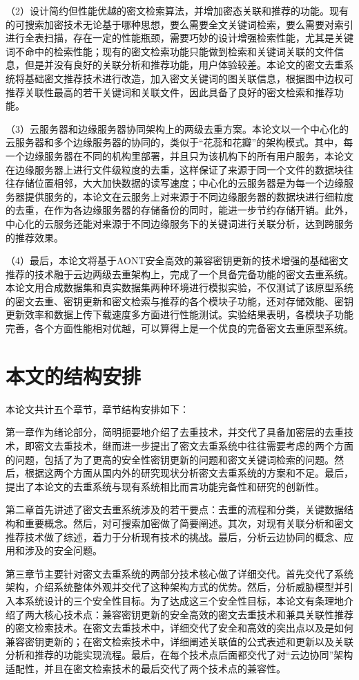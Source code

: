 \documentclass[promaster]{thesis-uestc}
\begin{document}
（2）设计简约但性能优越的密文检索算法，并增加密态关联和推荐的功能。现有的可搜索加密技术无论基于哪种思想，要么需要全文关键词检索，要么需要对索引进行全表扫描，存在一定的性能瓶颈，需要巧妙的设计增强检索性能，尤其是关键词不命中的检索性能；现有的密文检索功能只能做到检索和关键词关联的文件信息，但是并没有良好的关联分析和推荐功能，用户体验较差。本论文的密文去重系统将基础密文推荐技术进行改造，加入密文关键词的图关联信息，根据图中边权可推荐关联性最高的若干关键词和关联文件，因此具备了良好的密文检索和推荐功能。

（3）云服务器和边缘服务器协同架构上的两级去重方案。本论文以一个中心化的云服务器和多个边缘服务器的协同的，类似于“花蕊和花瓣”的架构模式。其中，每一个边缘服务器在不同的机构里部署，并且只为该机构下的所有用户服务，本论文在边缘服务器上进行文件级粒度的去重，这样保证了来源于同一个文件的数据块往往存储位置相邻，大大加快数据的读写速度；中心化的云服务器是为每一个边缘服务器提供服务的，本论文在云服务上对来源于不同边缘服务器的数据块进行细粒度的去重，在作为各边缘服务器的存储备份的同时，能进一步节约存储开销。此外，中心化的云服务还能对来源于不同边缘服务下的关键词进行关联分析，达到跨服务的推荐效果。

（4）最后，本论文将基于AONT安全高效的兼容密钥更新的技术增强的基础密文推荐的技术融于云边两级去重架构上，完成了一个具备完备功能的密文去重系统。本论文用合成数据集和真实数据集两种环境进行模拟实验，不仅测试了该原型系统的密文去重、密钥更新和密文检索与推荐的各个模块子功能，还对存储效能、密钥更新效率和数据上传下载速度多方面进行性能测试。实验结果表明，各模块子功能完善，各个方面性能相对优越，可以算得上是一个优良的完备密文去重原型系统。


\section{本文的结构安排}
本论文共计五个章节，章节结构安排如下：

第一章作为绪论部分，简明扼要地介绍了去重技术，并交代了具备加密层的去重技术，即密文去重技术，继而进一步提出了密文去重系统中往往需要考虑的两个方面的问题，包括了为了更高的安全性密钥更新的问题和密文关键词检索的问题。然后，根据这两个方面从国内外的研究现状分析密文去重系统的方案和不足。最后，提出了本论文的去重系统与现有系统相比而言功能完备性和研究的创新性。

第二章首先讲述了密文去重系统涉及的若干要点：去重的流程和分类，关键数据结构和重要概念。然后，对可搜索加密做了简要阐述。其次，对现有关联分析和密文推荐技术做了综述，着力于分析现有技术的挑战。最后，分析云边协同的概念、应用和涉及的安全问题。

第三章节主要针对密文去重系统的两部分技术核心做了详细交代。首先交代了系统架构，介绍系统整体外观并交代了这种架构方式的优势。然后，分析威胁模型并引入本系统设计的三个安全性目标。为了达成这三个安全性目标，本论文有条理地介绍了两大核心技术点：兼容密钥更新的安全高效的密文去重技术和兼具关联性推荐的密文检索技术。在密文去重技术中，详细交代了安全和高效的突出点以及是如何兼容密钥更新的；在密文检索技术中，详细阐述关联值的公式表述和更新以及关联分析和推荐的功能实现流程。最后，在每个技术点后面都交代了对“云边协同”架构适配性，并且在密文检索技术的最后交代了两个技术点的兼容性。
\end{document}
